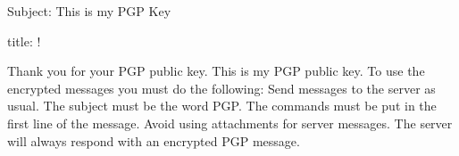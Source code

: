 Subject: This is my PGP Key

title: !

Thank you for your PGP public key. This is my PGP public key.
To use the encrypted messages you must do the following:
Send messages to the server as usual. The subject must be the word PGP.
The commands must be put in the first line of the message.
Avoid using attachments for server messages.
The server will always respond with an encrypted PGP message.
